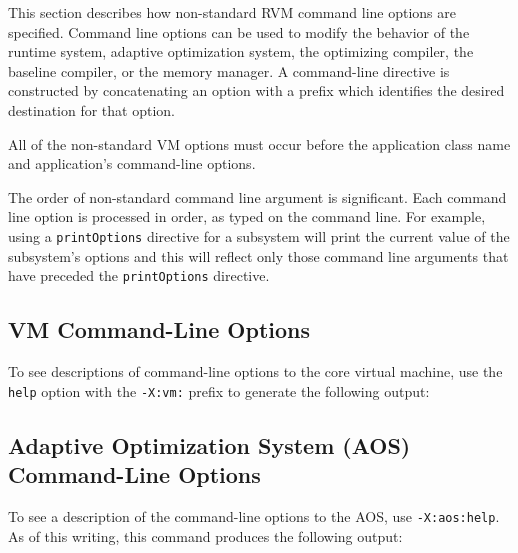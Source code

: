 \label{section:cmdline}

This section describes how non-standard \JikesTM{} RVM command
line options are specified. Command line options can be used to modify
the behavior of the runtime system, adaptive optimization system, the
optimizing compiler, the baseline compiler, or the memory manager.  A
command-line directive is constructed by concatenating an option with
a prefix which identifies the desired destination for that option.

All of the non-standard VM options must occur before 
the application class name and application's command-line options.

The order of non-standard command line argument is significant. Each
command line option is processed in order, as typed on the command
line. For example, using a {\tt printOptions} directive for a
subsystem will print the current value of the subsystem's options and
this will reflect only those command line arguments that have preceded
the {\tt printOptions} directive.

\subsection{VM Command-Line Options}
\label{section:vmoptions}

To see descriptions of command-line options to the core virtual
machine, use the {\tt help} option with the {\tt -X:vm:} prefix to
generate the following output:

\T \begin{tiny}

\T \end{tiny}


\subsection{Adaptive Optimization System (AOS) Command-Line Options}

To see a description of the command-line options to the AOS, use 
{\tt -X:aos:help}.  As of this writing, this command produces the
following output:

\T \begin{tiny}

\T \end{tiny}

